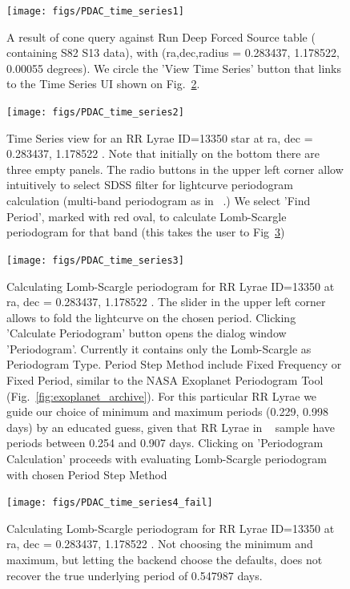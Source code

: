 \documentclass[fleqn,usenatbib]{mnras} %
\begin{document}
\begin{figure}
\texttt{[image: figs/PDAC\_time\_series1]}
\caption{A result of cone query against Run Deep Forced Source table ( containing S82 S13 data), with (ra,dec,radius = 0.283437, 1.178522, 0.00055 degrees). We circle the 'View Time Series' button that links to the Time Series UI  shown on Fig.~\ref{fig:time_series2}. }
\label{fig:time_series1}
\end{figure}

\begin{figure}
\texttt{[image: figs/PDAC\_time\_series2]}
\caption{Time Series view for an RR Lyrae ID=13350 star at ra, dec = 0.283437, 1.178522 . Note that initially on the bottom there are three empty panels. The radio buttons in the upper left corner allow intuitively to select SDSS filter for lightcurve periodogram calculation (multi-band periodogram as in ~\citep{vanderplas2015}.) We select 'Find Period', marked with red oval, to calculate Lomb-Scargle periodogram for that band (this takes the user to Fig~\ref{fig:time_series3}) }
\label{fig:time_series2}
\end{figure}


\begin{figure}
\texttt{[image: figs/PDAC\_time\_series3]}
\caption{Calculating Lomb-Scargle periodogram for RR Lyrae ID=13350 at  ra, dec = 0.283437, 1.178522 . The slider in the upper left corner allows to fold the lightcurve on the chosen period. Clicking 'Calculate Periodogram' button opens the dialog window 'Periodogram'. Currently it contains only the Lomb-Scargle as Periodogram Type. Period Step Method include Fixed Frequency or Fixed Period, similar to the NASA Exoplanet Periodogram Tool (Fig.~\ref{fig:exoplanet_archive}). For this particular RR Lyrae we guide our choice of minimum and maximum periods (0.229, 0.998 days) by an educated guess, given that RR Lyrae in ~\citep{sesar2010} sample have periods between  0.254 and 0.907 days. Clicking on 'Periodogram Calculation' proceeds with evaluating Lomb-Scargle periodogram with chosen Period Step Method }
\label{fig:time_series3}
\end{figure}


\begin{figure}
\texttt{[image: figs/PDAC\_time\_series4\_fail]}
\caption{Calculating Lomb-Scargle periodogram for RR Lyrae ID=13350  at  ra, dec = 0.283437, 1.178522 . Not choosing the minimum and maximum, but letting the backend choose the defaults, does not recover the true underlying period of 0.547987 days. }
\label{fig:time_series4f}
\end{figure}
\end{document}
